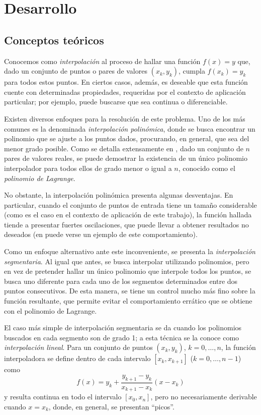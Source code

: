 \section{Desarrollo}
  
  \subsection{Conceptos teóricos}

    Conocemos como \emph{interpolación} al proceso de hallar una función $f(x) = y$ que, dado un conjunto de puntos o pares de valores $(x_k, y_k)$, cumpla $f(x_k) = y_k$ para todos estos puntos. En ciertos casos, además, es deseable que esta función cuente con determinadas propiedades, requeridas por el contexto de aplicación particular; por ejemplo, puede buscarse que sea continua o diferenciable.

    Existen diversos enfoques para la resolución de este problema. Uno de los más comunes es la denominada \emph{interpolación polinómica}, donde se busca encontrar un polinomio que se ajuste a los puntos dados, procurando, en general, que sea del menor grado posible. Como se detalla extensamente en \cite[sección 3.1]{Burden}, dado un conjunto de $n$ pares de valores reales, se puede demostrar la existencia de un único polinomio interpolador para todos ellos de grado menor o igual a $n$, conocido como el \emph{polinomio de Lagrange}.

    No obstante, la interpolación polinómica presenta algunas desventajas. En particular, cuando el conjunto de puntos de entrada tiene un tamaño considerable (como es el caso en el contexto de aplicación de este trabajo), la función hallada tiende a presentar fuertes oscilaciones, que puede llevar a obtener resultados no deseados (en \cite[p. 158]{Burden} puede verse un ejemplo de este comportamiento).

    Como un enfoque alternativo ante este inconveniente, se presenta la \emph{interpolación segmentaria}. Al igual que antes, se busca interpolar utilizando polinomios, pero en vez de pretender hallar un único polinomio que interpole todos los puntos, se busca uno diferente para cada uno de los segmentos determinados entre dos puntos consecutivos. De esta manera, se tiene un control mucho más fino sobre la función resultante, que permite evitar el comportamiento errático que se obtiene con el polinomio de Lagrange.

    El caso más simple de interpolación segmentaria se da cuando los polinomios buscados en cada segmento son de grado 1; a esta técnica se la conoce como \emph{interpolación lineal}. Para un conjunto de puntos $(x_k, y_k)$, $k = 0, \dots, n$, la función interpoladora se define dentro de cada intervalo $[x_k, x_{k+1}]$ ($k = 0, \dots, n-1$) como
      \[ f(x) = y_k + \frac{y_{k+1} - y_k}{x_{k+1} - x_k} (x - x_k) \]
    y resulta continua en todo el intervalo $[x_0, x_n]$, pero no necesariamente derivable cuando $x = x_k$, donde, en general, se presentan ``picos''.

